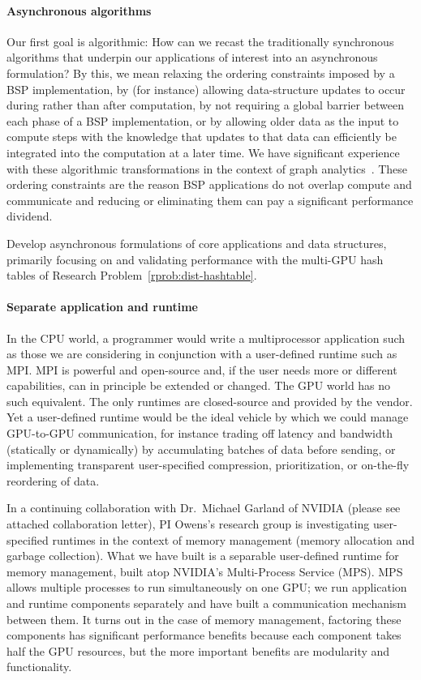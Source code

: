 \paragraph{Asynchronous algorithms}
Our first goal is algorithmic: How can we recast the traditionally synchronous algorithms that underpin our applications of interest into an asynchronous formulation? By this, we mean relaxing the ordering constraints imposed by a BSP implementation, by (for instance) allowing data-structure updates to occur during rather than after computation, by not requiring a global barrier between each phase of a BSP implementation, or by allowing older data as the input to compute steps with the knowledge that updates to that data can efficiently be integrated into the computation at a later time. We have significant experience with these algorithmic transformations in the context of graph analytics~\cite{Chen:2022:AAT,Chen:2022:SIP}. These ordering constraints are the reason BSP applications do not overlap compute and communicate and reducing or eliminating them can pay a significant performance dividend.

\begin{rproblem}
Develop asynchronous formulations of core applications and data structures, primarily focusing on and validating performance with the multi-GPU hash tables of Research Problem~\ref{rprob:dist-hashtable}.
\end{rproblem}

\paragraph{Separate application and runtime}
In the CPU world, a programmer would write a multiprocessor application such as those we are considering in conjunction with a user-defined runtime such as MPI\@. MPI is powerful and open-source and, if the user needs more or different capabilities, can in principle be extended or changed. The GPU world has no such equivalent. The only runtimes are closed-source and provided by the vendor. Yet a user-defined runtime would be the ideal vehicle by which we could manage GPU-to-GPU communication, for instance trading off latency and bandwidth (statically or dynamically) by accumulating batches of data before sending, or implementing transparent user-specified compression, prioritization, or on-the-fly reordering of data.

In a continuing collaboration with Dr.\ Michael Garland of NVIDIA (please see attached collaboration letter), PI Owens's research group is investigating user-specified runtimes in the context of memory management (memory allocation and garbage collection). What we have built is a separable user-defined runtime for memory management, built atop NVIDIA's Multi-Process Service (MPS)\@. MPS allows multiple processes to run simultaneously on one GPU\@; we run application and runtime components separately and have built a communication mechanism between them. It turns out in the case of memory management, factoring these components has significant performance benefits because each component takes half the GPU resources, but the more important benefits are modularity and functionality.

